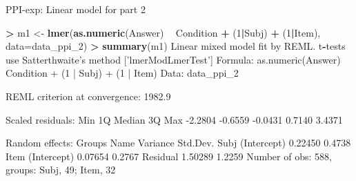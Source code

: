 \documentclass[ignorenonframetext,]{beamer}
\newenvironment{Shaded}{\begin{snugshade}}{\end{snugshade}}
\newcommand{\KeywordTok}[1]{\textcolor[rgb]{0.13,0.29,0.53}{\textbf{#1}}}
\newcommand{\DataTypeTok}[1]{\textcolor[rgb]{0.13,0.29,0.53}{#1}}
\newcommand{\DecValTok}[1]{\textcolor[rgb]{0.00,0.00,0.81}{#1}}
\newcommand{\StringTok}[1]{\textcolor[rgb]{0.31,0.60,0.02}{#1}}
\newcommand{\OperatorTok}[1]{\textcolor[rgb]{0.81,0.36,0.00}{\textbf{#1}}}
\newcommand{\NormalTok}[1]{#1}
\begin{document}
\begin{frame}[fragile]{PPI-exp: Linear model for part 2}

\tiny

\begin{Shaded}
\begin{Highlighting}[]
\OperatorTok{>}\StringTok{ }\NormalTok{m1 <-}\StringTok{ }\KeywordTok{lmer}\NormalTok{(}\KeywordTok{as.numeric}\NormalTok{(Answer) }\OperatorTok{~}\StringTok{ }\NormalTok{Condition }\OperatorTok{+}\StringTok{ }\NormalTok{(}\DecValTok{1}\OperatorTok{|}\NormalTok{Subj) }\OperatorTok{+}\StringTok{ }\NormalTok{(}\DecValTok{1}\OperatorTok{|}\NormalTok{Item), }\DataTypeTok{data=}\NormalTok{data_ppi_}\DecValTok{2}\NormalTok{)}
\OperatorTok{>}\StringTok{ }\KeywordTok{summary}\NormalTok{(m1)}
\NormalTok{Linear mixed model fit by REML. t}\OperatorTok{-}\NormalTok{tests use Satterthwaite}\StringTok{'s method ['}\NormalTok{lmerModLmerTest}\StringTok{']}
\StringTok{Formula: as.numeric(Answer) ~ Condition + (1 | Subj) + (1 | Item)}
\StringTok{   Data: data_ppi_2}

\StringTok{REML criterion at convergence: 1982.9}

\StringTok{Scaled residuals: }
\StringTok{    Min      1Q  Median      3Q     Max }
\StringTok{-2.2804 -0.6559 -0.0431  0.7140  3.4371 }

\StringTok{Random effects:}
\StringTok{ Groups   Name        Variance Std.Dev.}
\StringTok{ Subj     (Intercept) 0.22450  0.4738  }
\StringTok{ Item     (Intercept) 0.07654  0.2767  }
\StringTok{ Residual             1.50289  1.2259  }
\StringTok{Number of obs: 588, groups:  Subj, 49; Item, 32}
\end{Highlighting}
\end{Shaded}

\end{frame}
\end{document}
